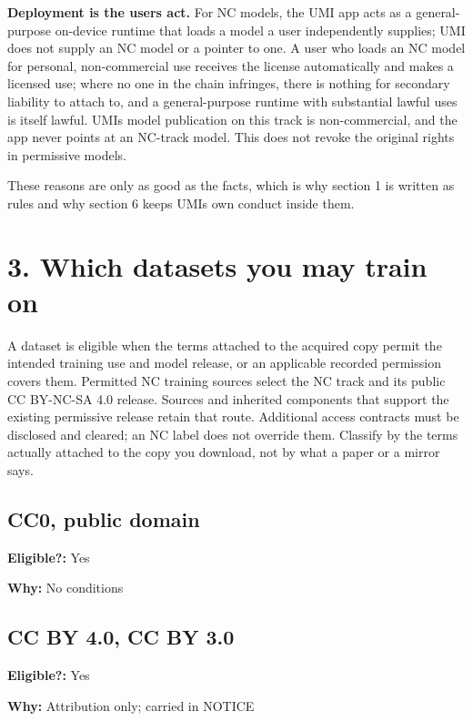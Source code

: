 \documentclass[10pt,a4paper]{article}
\begin{document}
\textbf{Deployment is the user\textquotesingle s act.} For NC models,
the UMI app acts as a general-purpose on-device runtime that loads a
model a user independently supplies; UMI does not supply an NC model or
a pointer to one. A user who loads an NC model for personal,
non-commercial use receives the license automatically and makes a
licensed use; where no one in the chain infringes, there is nothing for
secondary liability to attach to, and a general-purpose runtime with
substantial lawful uses is itself lawful. UMI\textquotesingle s model
publication on this track is non-commercial, and the app never points at
an NC-track model. This does not revoke the original rights in
permissive models.

These reasons are only as good as the facts, which is why section 1 is
written as rules and why section 6 keeps UMI\textquotesingle s own
conduct inside them.

\section{3. Which datasets you may train
on}\label{3-which-datasets-you-may-train-on}

A dataset is eligible when the terms attached to the acquired copy
permit the intended training use and model release, or an applicable
recorded permission covers them. Permitted NC training sources select
the NC track and its public CC BY-NC-SA 4.0 release. Sources and
inherited components that support the existing permissive release retain
that route. Additional access contracts must be disclosed and cleared;
an NC label does not override them. Classify by the terms actually
attached to the copy you download, not by what a paper or a mirror says.

\subsection{CC0, public domain}\label{cc0-public-domain}

\textbf{Eligible?:} Yes

\textbf{Why:} No conditions

\subsection{CC BY 4.0, CC BY 3.0}\label{cc-by-40-cc-by-30}

\textbf{Eligible?:} Yes

\textbf{Why:} Attribution only; carried in NOTICE
\end{document}
